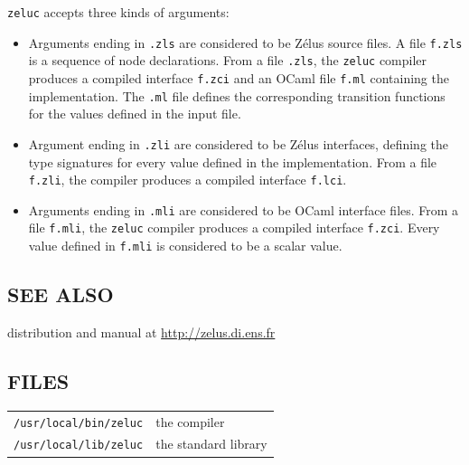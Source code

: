 \documentclass[11pt,titlepage,twoside]{report}
\newcommand{\zelus}{{\sf Z\'elus}}
\newcommand{\ocaml}{{\sf OCaml}}
\begin{document}
\verb-zeluc- accepts three kinds of arguments:

\begin{itemize}
\item
Arguments ending in \verb-.zls- are considered to be \zelus{} source
files. A file \verb-f.zls- is a sequence of node declarations. From a
file \verb-.zls-, the \verb-zeluc- compiler produces a compiled
interface \verb-f.zci- and an \ocaml{} file \verb-f.ml- containing the
implementation. The \verb-.ml- file defines the corresponding
transition functions for the values defined in the input file.
\item
Argument ending in \verb-.zli- are considered to be \zelus{}
interfaces, defining the type signatures for every value defined in the
implementation. From a file \verb-f.zli-, 
the compiler produces a compiled interface
\verb-f.lci-.
\item
Arguments ending in \verb-.mli- are considered to be \ocaml{}
interface files. From a file \verb-f.mli-, the 
\verb-zeluc- compiler produces a compiled interface \verb-f.zci-.
Every value defined in \verb-f.mli- is considered to be a scalar value.
\end{itemize}


\subsection*{SEE ALSO}

distribution and manual at \url{http://zelus.di.ens.fr}

\subsection*{FILES}

\begin{tabular}{ll}
{\tt /usr/local/bin/zeluc}           & the compiler
\\
{\tt /usr/local/lib/zeluc} & the standard library
\end{tabular}



\end{document}
